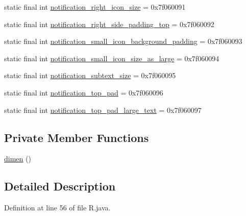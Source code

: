 \begin{DoxyCompactItemize}
\item 
static final int \mbox{\hyperlink{classandroid_1_1support_1_1v7_1_1recyclerview_1_1_r_1_1dimen_ad2231ee1cb2a7c7d222b01fdcdf21d53}{notification\+\_\+right\+\_\+icon\+\_\+size}} = 0x7f060091
\item 
static final int \mbox{\hyperlink{classandroid_1_1support_1_1v7_1_1recyclerview_1_1_r_1_1dimen_a10fca1bb823d527ef88180368bfd1fe3}{notification\+\_\+right\+\_\+side\+\_\+padding\+\_\+top}} = 0x7f060092
\item 
static final int \mbox{\hyperlink{classandroid_1_1support_1_1v7_1_1recyclerview_1_1_r_1_1dimen_ad5be1a4f374ad8f418c30ad8617f2da4}{notification\+\_\+small\+\_\+icon\+\_\+background\+\_\+padding}} = 0x7f060093
\item 
static final int \mbox{\hyperlink{classandroid_1_1support_1_1v7_1_1recyclerview_1_1_r_1_1dimen_afa8bf9c44e5c4c2dc525df28ebbfd954}{notification\+\_\+small\+\_\+icon\+\_\+size\+\_\+as\+\_\+large}} = 0x7f060094
\item 
static final int \mbox{\hyperlink{classandroid_1_1support_1_1v7_1_1recyclerview_1_1_r_1_1dimen_a4d68a0774b279ed0669648dc6b60ff5c}{notification\+\_\+subtext\+\_\+size}} = 0x7f060095
\item 
static final int \mbox{\hyperlink{classandroid_1_1support_1_1v7_1_1recyclerview_1_1_r_1_1dimen_a4063e3fc0ff4315f66c6115a2a18fca6}{notification\+\_\+top\+\_\+pad}} = 0x7f060096
\item 
static final int \mbox{\hyperlink{classandroid_1_1support_1_1v7_1_1recyclerview_1_1_r_1_1dimen_a10e60729bcb5e62df2e95ff21a1f777e}{notification\+\_\+top\+\_\+pad\+\_\+large\+\_\+text}} = 0x7f060097
\end{DoxyCompactItemize}
\subsection*{Private Member Functions}
\begin{DoxyCompactItemize}
\item 
\mbox{\hyperlink{classandroid_1_1support_1_1v7_1_1recyclerview_1_1_r_1_1dimen_a53aac2f5b806fc1f173e8313c467aa71}{dimen}} ()
\end{DoxyCompactItemize}


\subsection{Detailed Description}


Definition at line 56 of file R.\+java.



